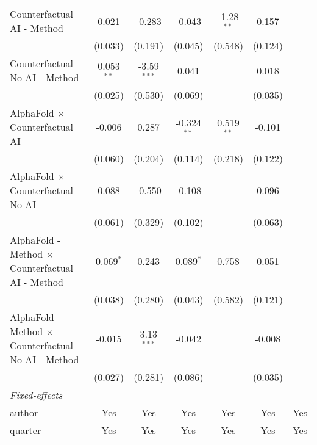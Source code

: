 \begin{tabular}{lcccccc}
   Counterfactual AI - Method                                 & 0.021        & -0.283        & -0.043        & -1.28$^{**}$ & 0.157       &   \\   
                                                              & (0.033)      & (0.191)       & (0.045)       & (0.548)      & (0.124)     &   \\   
   Counterfactual No AI - Method                              & 0.053$^{**}$ & -3.59$^{***}$ & 0.041         &              & 0.018       &   \\   
                                                              & (0.025)      & (0.530)       & (0.069)       &              & (0.035)     &   \\   
   AlphaFold $\times$ Counterfactual AI                       & -0.006       & 0.287         & -0.324$^{**}$ & 0.519$^{**}$ & -0.101      &   \\   
                                                              & (0.060)      & (0.204)       & (0.114)       & (0.218)      & (0.122)     &   \\   
   AlphaFold $\times$ Counterfactual No AI                    & 0.088        & -0.550        & -0.108        &              & 0.096       &   \\   
                                                              & (0.061)      & (0.329)       & (0.102)       &              & (0.063)     &   \\   
   AlphaFold - Method $\times$ Counterfactual AI - Method     & 0.069$^{*}$  & 0.243         & 0.089$^{*}$   & 0.758        & 0.051       &   \\   
                                                              & (0.038)      & (0.280)       & (0.043)       & (0.582)      & (0.121)     &   \\   
   AlphaFold - Method $\times$ Counterfactual No AI - Method  & -0.015       & 3.13$^{***}$  & -0.042        &              & -0.008      &   \\   
                                                              & (0.027)      & (0.281)       & (0.086)       &              & (0.035)     &   \\   
   \midrule
   \emph{Fixed-effects}\\
   author                                                     & Yes          & Yes           & Yes           & Yes          & Yes         & Yes\\  
   quarter                                                    & Yes          & Yes           & Yes           & Yes          & Yes         & Yes\\  

\end{tabular}

